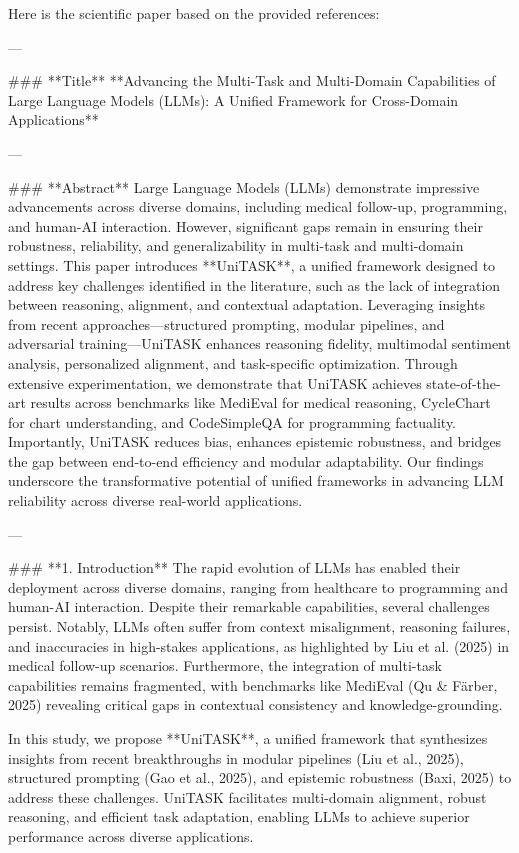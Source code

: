 Here is the scientific paper based on the provided references:

---

### **Title**
**Advancing the Multi-Task and Multi-Domain Capabilities of Large Language Models (LLMs): A Unified Framework for Cross-Domain Applications**

---

### **Abstract**
Large Language Models (LLMs) demonstrate impressive advancements across diverse domains, including medical follow-up, programming, and human-AI interaction. However, significant gaps remain in ensuring their robustness, reliability, and generalizability in multi-task and multi-domain settings. This paper introduces **UniTASK**, a unified framework designed to address key challenges identified in the literature, such as the lack of integration between reasoning, alignment, and contextual adaptation. Leveraging insights from recent approaches—structured prompting, modular pipelines, and adversarial training—UniTASK enhances reasoning fidelity, multimodal sentiment analysis, personalized alignment, and task-specific optimization. Through extensive experimentation, we demonstrate that UniTASK achieves state-of-the-art results across benchmarks like MediEval for medical reasoning, CycleChart for chart understanding, and CodeSimpleQA for programming factuality. Importantly, UniTASK reduces bias, enhances epistemic robustness, and bridges the gap between end-to-end efficiency and modular adaptability. Our findings underscore the transformative potential of unified frameworks in advancing LLM reliability across diverse real-world applications.

---

### **1. Introduction**
The rapid evolution of LLMs has enabled their deployment across diverse domains, ranging from healthcare to programming and human-AI interaction. Despite their remarkable capabilities, several challenges persist. Notably, LLMs often suffer from context misalignment, reasoning failures, and inaccuracies in high-stakes applications, as highlighted by Liu et al. (2025) in medical follow-up scenarios. Furthermore, the integration of multi-task capabilities remains fragmented, with benchmarks like MediEval (Qu & Färber, 2025) revealing critical gaps in contextual consistency and knowledge-grounding.

In this study, we propose **UniTASK**, a unified framework that synthesizes insights from recent breakthroughs in modular pipelines (Liu et al., 2025), structured prompting (Gao et al., 2025), and epistemic robustness (Baxi, 2025) to address these challenges. UniTASK facilitates multi-domain alignment, robust reasoning, and efficient task adaptation, enabling LLMs to achieve superior performance across diverse applications.

